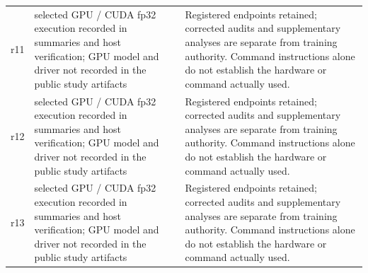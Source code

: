\begin{longtable}{@{}>{\raggedright\arraybackslash}p{0.400in}>{\raggedright\arraybackslash}p{2.000in}>{\raggedright\arraybackslash}p{0.700in}>{\raggedright\arraybackslash}p{2.800in}@{}}
r11 & selected GPU /\allowbreak{} CUDA fp32 execution recorded in summaries and host verification; GPU model and driver not recorded in the public study artifacts & 10 & Registered endpoints retained; corrected audits and supplementary analyses are separate from training authority. Command instructions alone do not establish the hardware or command actually used. \\*
r12 & selected GPU /\allowbreak{} CUDA fp32 execution recorded in summaries and host verification; GPU model and driver not recorded in the public study artifacts & 10 & Registered endpoints retained; corrected audits and supplementary analyses are separate from training authority. Command instructions alone do not establish the hardware or command actually used. \\*
r13 & selected GPU /\allowbreak{} CUDA fp32 execution recorded in summaries and host verification; GPU model and driver not recorded in the public study artifacts & 32 & Registered endpoints retained; corrected audits and supplementary analyses are separate from training authority. Command instructions alone do not establish the hardware or command actually used. \\
\end{longtable}
\endgroup
